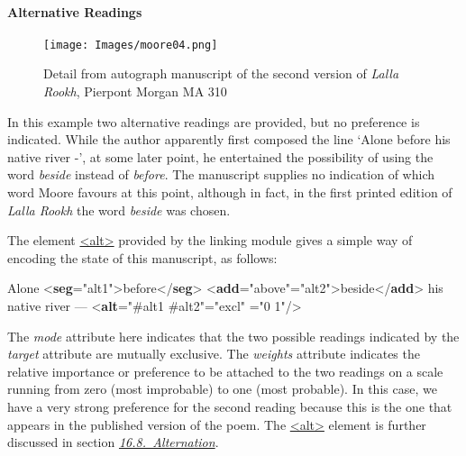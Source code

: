\paragraph[{Alternative Readings}]{Alternative Readings}\label{alter}\par
\begin{figure}[htbp]
\noindent\noindent\texttt{[image: Images/moore04.png]}
\caption{Detail from autograph manuscript of the second version of \textit{Lalla Rookh}, Pierpont Morgan MA 310}\end{figure}
 In this example two alternative readings are provided, but no preference is indicated. While the author apparently first composed the line ‘Alone before his native river -’, at some later point, he entertained the possibility of using the word \textit{beside} instead of \textit{before}. The manuscript supplies no indication of which word Moore favours at this point, although in fact, in the first printed edition of \textit{Lalla Rookh} the word \textit{beside} was chosen.\par
The element \hyperref[TEI.alt]{<alt>} provided by the \textsf{linking} module gives a simple way of encoding the state of this manuscript, as follows: \par\bgroup{}\exampleFont \begin{shaded}\noindent\mbox{}Alone {<\textbf{seg}\hspace*{1em}{xml:id}="{alt1}">}before{</\textbf{seg}>}\mbox{}\newline 
{<\textbf{add}\hspace*{1em}{place}="{above}"\hspace*{1em}{xml:id}="{alt2}">}beside{</\textbf{add}>} his native river ­—\mbox{}\newline 
\mbox{}\newline 
{<\textbf{alt}\hspace*{1em}{target}="{\#alt1 \#alt2}"\hspace*{1em}{mode}="{excl}"\mbox{}\newline 
\hspace*{1em}{weights}="{0 1}"/>}\end{shaded}\egroup\par \par
The {\itshape mode} attribute here indicates that the two possible readings indicated by the {\itshape target} attribute are mutually exclusive. The {\itshape weights} attribute indicates the relative importance or preference to be attached to the two readings on a scale running from zero (most improbable) to one (most probable). In this case, we have a very strong preference for the second reading because this is the one that appears in the published version of the poem. The \hyperref[TEI.alt]{<alt>} element is further discussed in section \textit{\hyperref[SAAT]{16.8.\ Alternation}}.
